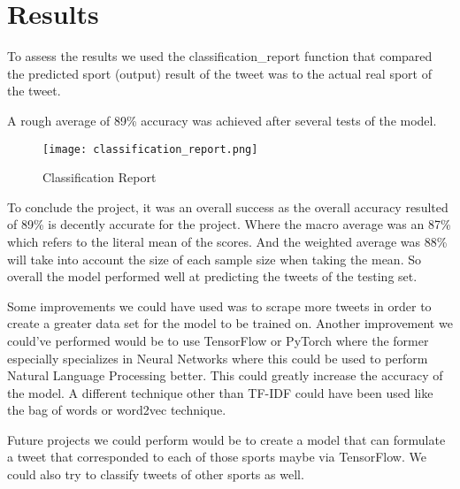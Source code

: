 \documentclass{article}
\begin{document}
\section{Results}
    To assess the results we used the classification\_report function that compared the predicted sport (output) result of the tweet was to the actual real sport of the tweet.

    A rough average of 89\% accuracy was achieved after several tests of the model. 
    
\begin{figure}[ht!]
    \centering
    \texttt{[image: classification\_report.png]}
    \caption{Classification Report}
    \label{f:classification_report}
\end{figure}

    To conclude the project, it was an overall success as the overall accuracy resulted of 89\%  is decently accurate for the project. Where the macro average was an 87\% which refers to the literal mean of the scores. And the weighted average was 88\% will take into account the size of each sample size when taking the mean. So overall the model performed well at predicting the tweets of the testing set.

    Some improvements we could have used was to scrape more tweets in order to create a greater data set for the model to be trained on. Another improvement we could've performed would be to use TensorFlow or PyTorch where the former especially specializes in Neural Networks where this could be used to perform Natural Language Processing better. This could greatly increase the accuracy of the model. A different technique other than TF-IDF could have been used like the bag of words or word2vec technique.

    Future projects we could perform would be to create a model that can formulate a tweet that corresponded to each of those sports maybe via TensorFlow. We could also try to classify tweets of other sports as well. 
\end{document}
